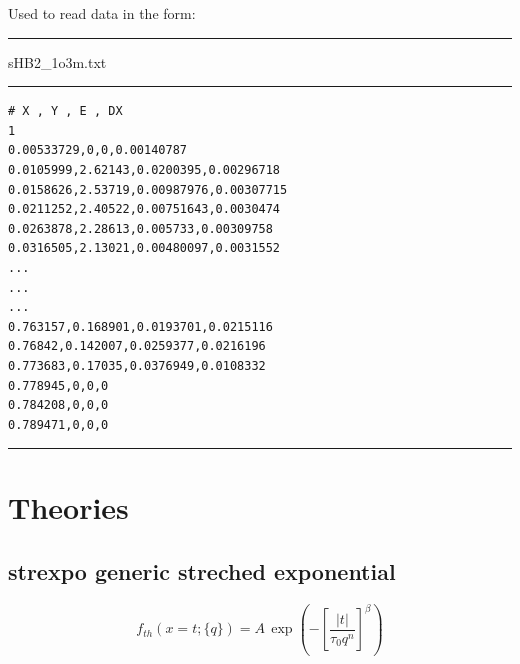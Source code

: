 \documentclass[11pt,fleqn]{book} %
\newcommand{\desc}[1]{\hskip 0.5cm {\color{descgray} #1}}
\begin{document}
Used to read data in the form:

\rule{5cm}{1pt} sHB2\_1o3m.txt  \rule{5cm}{1pt} 
%
\footnotesize
\begin{verbatim}
# X , Y , E , DX
1
0.00533729,0,0,0.00140787
0.0105999,2.62143,0.0200395,0.00296718
0.0158626,2.53719,0.00987976,0.00307715
0.0211252,2.40522,0.00751643,0.0030474
0.0263878,2.28613,0.005733,0.00309758
0.0316505,2.13021,0.00480097,0.0031552
...
...
...
0.763157,0.168901,0.0193701,0.0215116
0.76842,0.142007,0.0259377,0.0216196
0.773683,0.17035,0.0376949,0.0108332
0.778945,0,0,0
0.784208,0,0,0
0.789471,0,0,0
\end{verbatim}
\normalsize
%
\rule{10cm+}{1pt}


\part{Theories}

\chapter{strexpo \desc{generic streched exponential}}


\begin{exercise}
\begin{equation}
f_{th}(x=t;\{q\}) = A \, \exp \left (
- \left [ \frac{|t|}{\tau_0 q^n}
 \right ]^\beta
 \right )
\end{equation}
\end{exercise}
\end{document}
